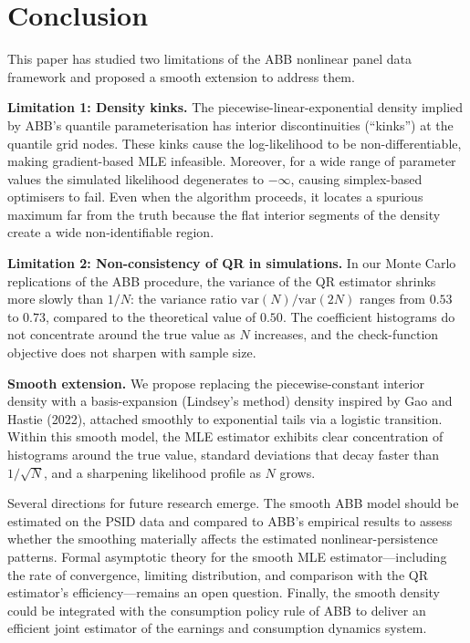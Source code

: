 \documentclass[12pt]{article}
\begin{document}
\section{Conclusion}
\label{sec:conclusion}

This paper has studied two limitations of the ABB nonlinear panel data
framework and proposed a smooth extension to address them.

\textbf{Limitation 1: Density kinks.}
The piecewise-linear-exponential density implied by ABB's quantile
parameterisation has interior discontinuities (``kinks'') at the quantile
grid nodes.
These kinks cause the log-likelihood to be non-differentiable, making
gradient-based MLE infeasible.
Moreover, for a wide range of parameter values the simulated likelihood
degenerates to $-\infty$, causing simplex-based optimisers to fail.
Even when the algorithm proceeds, it locates a spurious maximum far from
the truth because the flat interior segments of the density create a
wide non-identifiable region.

\textbf{Limitation 2: Non-consistency of QR in simulations.}
In our Monte Carlo replications of the ABB procedure, the variance of the
QR estimator shrinks more slowly than $1/N$: the variance ratio
$\text{var}(N)/\text{var}(2N)$ ranges from $0.53$ to $0.73$, compared
to the theoretical value of $0.50$.
The coefficient histograms do not concentrate around the true value as $N$
increases, and the check-function objective does not sharpen with sample size.

\textbf{Smooth extension.}
We propose replacing the piecewise-constant interior density with a
basis-expansion (Lindsey's method) density inspired by Gao and Hastie (2022),
attached smoothly to exponential tails via a logistic transition.
Within this smooth model, the MLE estimator exhibits clear concentration of
histograms around the true value, standard deviations that decay faster than
$1/\sqrt{N}$, and a sharpening likelihood profile as $N$ grows.

Several directions for future research emerge.
The smooth ABB model should be estimated on the PSID data and compared to
ABB's empirical results to assess whether the smoothing materially affects
the estimated nonlinear-persistence patterns.
Formal asymptotic theory for the smooth MLE estimator---including the
rate of convergence, limiting distribution, and comparison with the QR
estimator's efficiency---remains an open question.
Finally, the smooth density could be integrated with the consumption policy
rule of ABB to deliver an efficient joint estimator of the earnings and
consumption dynamics system.
\end{document}
